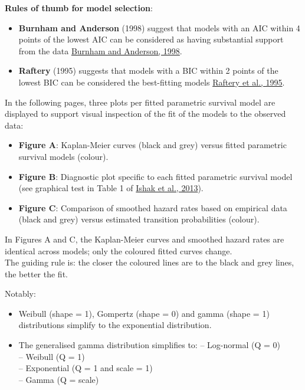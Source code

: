 \documentclass[
]{article}
\providecommand{\tightlist}{%
  \setlength{\itemsep}{0pt}\setlength{\parskip}{0pt}}
\begin{document}
\textbf{Rules of thumb for model selection}:

\begin{itemize}
\tightlist
\item
  \textbf{Burnham and Anderson} (1998) suggest that models with an AIC
  within 4 points of the lowest AIC can be considered as having
  substantial support from the data
  \href{https://doi.org/10.1007/978-1-4757-2917-7}{Burnham and Anderson,
  1998}.\\
\item
  \textbf{Raftery} (1995) suggests that models with a BIC within 2
  points of the lowest BIC can be considered the best-fitting models
  \href{https://doi.org/10.2307/271063}{Raftery et al., 1995}.
\end{itemize}

In the following pages, three plots per fitted parametric survival model
are displayed to support visual inspection of the fit of the models to
the observed data:

\begin{itemize}
\tightlist
\item
  \textbf{Figure A}: Kaplan-Meier curves (black and grey) versus fitted
  parametric survival models (colour).\\
\item
  \textbf{Figure B}: Diagnostic plot specific to each fitted parametric
  survival model (see graphical test in Table 1 of
  \href{https://doi.org/10.1007/s40273-013-0064-3}{Ishak et al., 2013}).
\item
  \textbf{Figure C}: Comparison of smoothed hazard rates based on
  empirical data (black and grey) versus estimated transition
  probabilities (colour).
\end{itemize}

In Figures A and C, the Kaplan-Meier curves and smoothed hazard rates
are identical across models; only the coloured fitted curves change.\\
The guiding rule is: the closer the coloured lines are to the black and
grey lines, the better the fit.

Notably:

\begin{itemize}
\tightlist
\item
  Weibull (shape = 1), Gompertz (shape = 0) and gamma (shape = 1)
  distributions simplify to the exponential distribution.\\
\item
  The generalised gamma distribution simplifies to: -- Log-normal (Q =
  0)\\
  -- Weibull (Q = 1)\\
  -- Exponential (Q = 1 and scale = 1)\\
  -- Gamma (Q = scale)
\end{itemize}
\end{document}

